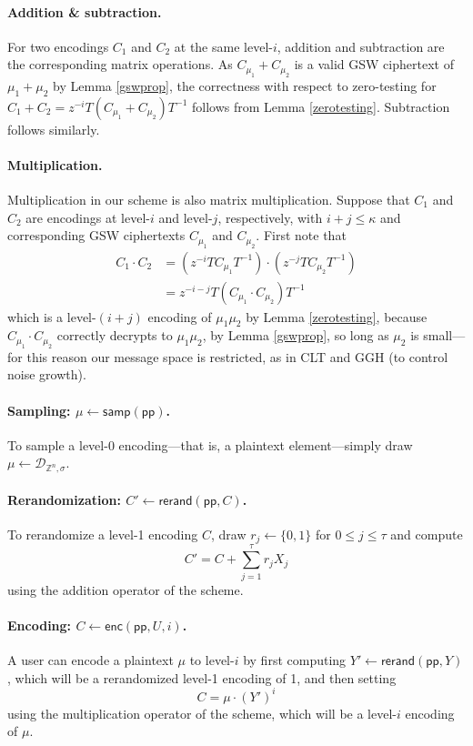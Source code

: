 \paragraph{Addition \& subtraction.}  For two encodings $C_1$ and $C_2$ at the same level-$i$, addition and subtraction are the corresponding matrix operations. As $C_{\mu_1}+ C_{\mu_2}$ is a valid GSW ciphertext of $\mu_1 + \mu_2$ by Lemma \ref{gswprop}, the correctness with respect to zero-testing for $C_1 + C_2 = z^{-i}T(C_{\mu_1}+C_{\mu_2})T^{-1}$ follows from Lemma \ref{zerotesting}.  Subtraction follows similarly.

\paragraph{Multiplication.}  Multiplication in our scheme is also matrix multiplication.  Suppose that $C_1$ and $C_2$ are encodings at level-$i$ and level-$j$, respectively, with $i+j \leq \kappa$ and corresponding GSW ciphertexts $C_{\mu_1}$ and $C_{\mu_2}$.  First note that
\begin{align*}
C_1\cdot C_2 &= (z^{-i}TC_{\mu_1}T^{-1})\cdot(z^{-j}TC_{\mu_2}T^{-1})\\
&= z^{-i-j}T(C_{\mu_1}\cdot C_{\mu_2})T^{-1}
\end{align*}
which is a level-$(i+j)$ encoding of $\mu_1\mu_2$ by Lemma \ref{zerotesting}, because $C_{\mu_1} \cdot C_{\mu_2}$ correctly decrypts to $\mu_1\mu_2$, by Lemma \ref{gswprop}, so long as $\mu_2$ is small---for this reason our message space is restricted, as in CLT and GGH (to control noise growth).

\paragraph{Sampling:  $\mu \leftarrow \mathsf{samp}(\mathsf{pp})$.}  To sample a level-0 encoding---that is, a plaintext element---simply draw $\mu\leftarrow \mathcal{D}_{\mathbb{Z}^n, \sigma}$.

\paragraph{Rerandomization: $C' \leftarrow \mathsf{rerand}(\mathsf{pp}, C)$.}  To rerandomize a level-1 encoding $C$, draw $r_j \leftarrow \{0,1\}$ for $0 \leq j \leq \tau$ and compute $$C' = C + \sum_{j=1}^\tau r_jX_j$$ using the addition operator of the scheme.

\paragraph{Encoding:  $C \leftarrow \mathsf{enc}(\mathsf{pp},U,i)$.}  A user can encode a plaintext $\mu$ to level-$i$ by first computing $Y' \leftarrow \mathsf{rerand}(\mathsf{pp}, Y)$, which will be a rerandomized level-1 encoding of 1, and then setting $$C = \mu \cdot \left(Y'\right)^i$$ using the multiplication operator of the scheme, which will be a level-$i$ encoding of $\mu$.

